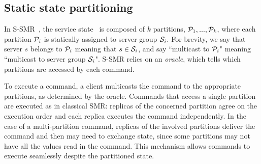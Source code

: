 \subsection{Static state partitioning}
\label{sec:ssmr}

%
%
%
In S-SMR~\cite{bezerra2014ssmr}, the service state \vvt\ is composed of $k$ partitions, $\mathcal{P}_1, ..., \mathcal{P}_k$, where each partition $\mathcal{P}_i$ is statically assigned to server group $\mathcal{S}_i$. 
For brevity, we say that server $s$ belongs to $\mathcal{P}_i$ meaning that $s \in \mathcal{S}_i$, and say ``multicast to $\mathcal{P}_i$" meaning ``multicast to server group $\mathcal{S}_i$".
S-SMR relies on an \emph{oracle}, which tells which partitions are accessed by each command.

To execute a command, a client multicasts the command to the appropriate partitions, as determined by the oracle.
Commands that access a single partition are executed as in classical SMR: replicas of the concerned partition agree on the execution order and each replica executes the command independently.
In the case of a multi-partition command, replicas of the involved partitions deliver the command and then may need to exchange state, since some partitions may not have all the values read in the command.
This mechanism allows commands to execute seamlessly despite the partitioned state.

